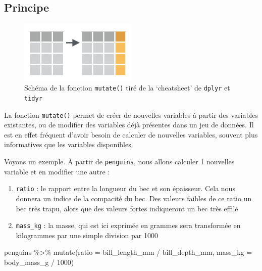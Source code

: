 \documentclass[
  letterpaper,
  DIV=11,
  numbers=noendperiod]{scrreprt}
\newenvironment{Shaded}{\begin{snugshade}}{\end{snugshade}}
\newcommand{\AttributeTok}[1]{\textcolor[rgb]{0.40,0.45,0.13}{#1}}
\newcommand{\DecValTok}[1]{\textcolor[rgb]{0.68,0.00,0.00}{#1}}
\newcommand{\FunctionTok}[1]{\textcolor[rgb]{0.28,0.35,0.67}{#1}}
\newcommand{\NormalTok}[1]{\textcolor[rgb]{0.00,0.23,0.31}{#1}}
\newcommand{\SpecialCharTok}[1]{\textcolor[rgb]{0.37,0.37,0.37}{#1}}
\providecommand{\tightlist}{%
  \setlength{\itemsep}{0pt}\setlength{\parskip}{0pt}}\usepackage{longtable,booktabs,array}
\begin{document}
\hypertarget{principe-1}{%
\subsection{Principe}\label{principe-1}}

\begin{figure}

{\centering \includegraphics[width=0.5\textwidth,height=\textheight]{./images/mutate.png}

}

\caption{Schéma de la fonction \texttt{mutate()} tiré de la `cheatsheet'
de \texttt{dplyr} et \texttt{tidyr}}

\end{figure}

La fonction \texttt{mutate()} permet de créer de nouvelles variables à
partir des variables existantes, ou de modifier des variables déjà
présentes dans un jeu de données. Il est en effet fréquent d'avoir
besoin de calculer de nouvelles variables, souvent plus informatives que
les variables disponibles.

Voyons un exemple. À partir de \texttt{penguins}, nous allons calculer 1
nouvelles variable et en modifier une autre :

\begin{enumerate}
\def\labelenumi{\arabic{enumi}.}
\tightlist
\item
  \texttt{ratio} : le rapport entre la longueur du bec et son épaisseur.
  Cela nous donnera un indice de la compacité du bec. Des valeurs
  faibles de ce ratio un bec très trapu, alors que des valeurs fortes
  indiqueront un bec très effilé
\item
  \texttt{mass\_kg} : la masse, qui est ici exprimée en grammes sera
  transformée en kilogrammes par une simple division par 1000
\end{enumerate}

\begin{Shaded}
\begin{Highlighting}[]
\NormalTok{penguins }\SpecialCharTok{\%\textgreater{}\%}
  \FunctionTok{mutate}\NormalTok{(}\AttributeTok{ratio =}\NormalTok{ bill\_length\_mm }\SpecialCharTok{/}\NormalTok{ bill\_depth\_mm,}
         \AttributeTok{mass\_kg =}\NormalTok{ body\_mass\_g }\SpecialCharTok{/} \DecValTok{1000}\NormalTok{)}
\end{Highlighting}
\end{Shaded}
\end{document}

